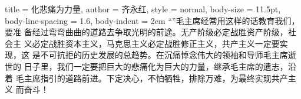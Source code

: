\begin{hongqiarticle}{
        title  = {化悲痛为力量},
        author = {齐永红},
        style  = normal,
        body-size = 11.5pt,
        body-line-spacing = 1.6,
        body-indent = 2em
    }
    “”毛主席经常用这样的话教育我们，要准
    备经过弯弯曲曲的道路去争取光明的前途。无产阶级必定战胜资产阶级，社会主
    义必定战胜资本主义，马克思主义必定战胜修正主义，共产主义一定要实现，这
    是不可抗拒的历史发展的总趋势。在沉痛悼念伟大的领袖和导师毛主席逝世的
    日子里，我们一定要把巨大的悲痛化为巨大的力量，继承毛主席的遗志，沿着
    毛主席指引的道路前进。下定决心，不怕牺牲，排除万难，为最终实现共产主义
    而奋斗！
\end{hongqiarticle}
